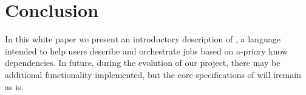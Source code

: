 \section{Conclusion}
\label{sect:conc}
In this white paper we present an introductory description of \lang{}, a language
intended to help users describe and orchestrate jobs based on a-priory know dependencies.
In future, during the evolution of our project, there may be additional functionality
implemented, but the core specifications of \lang{} will iremain as is.
